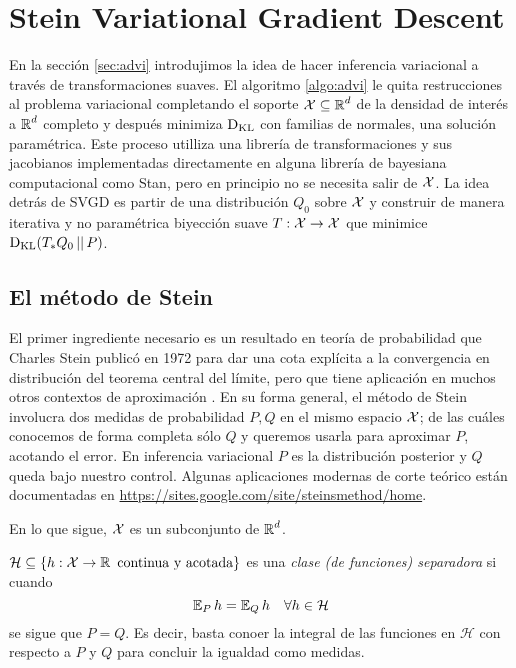 \documentclass[main.tex]{subfiles}
\begin{document}
\chapter{Stein Variational Gradient Descent}
En la sección \ref{sec:advi} introdujimos la idea de hacer inferencia variacional a través de transformaciones suaves. El algoritmo \eqref{algo:advi} le quita restrucciones al problema variacional completando el soporte $\operatorname{\mathcal{X}}\subseteq\operatorname{\mathbb{R}}^d$ de la densidad de interés a $\operatorname{\mathbb{R}}^d$ completo y después minimiza $\operatorname*{D_{KL}}$ con familias de normales, una solución paramétrica. Este proceso utilliza una librería de transformaciones y sus jacobianos implementadas directamente en alguna librería de bayesiana computacional como Stan\cite{advi}, pero en principio no se necesita salir de $\operatorname{\mathcal{X}}$. La idea detrás de SVGD es partir de una distribución $Q_0$ sobre $\operatorname{\mathcal{X}}$ y construir de manera iterativa y no paramétrica biyección suave $T: \operatorname{\mathcal{X}} \to \operatorname{\mathcal{X}}$ que minimice $\operatorname*{D_{KL}}(T_*Q_0\operatorname*{\mid\mid} P)$.

\section{El método de Stein}

El primer ingrediente necesario es un resultado en teoría de probabilidad que Charles Stein publicó en 1972 para dar una cota explícita a la convergencia en distribución del teorema central del límite, pero que tiene aplicación en muchos otros contextos de aproximación \cite{stein-magic-method, formal-stein-method}. En su forma general, el método de Stein involucra dos medidas de probabilidad $P, Q$ en el mismo espacio $\operatorname{\mathcal{X}}$; de las cuáles conocemos de forma completa sólo $Q$ y queremos usarla para aproximar $P$, acotando el error. En inferencia variacional $P$ es la distribución posterior y $Q$ queda bajo nuestro control. Algunas aplicaciones modernas de corte teórico están documentadas en \url{https://sites.google.com/site/steinsmethod/home}. 


En lo que sigue, $\operatorname{\mathcal{X}}$ es un subconjunto de $\operatorname{\mathbb{R}}^d$.

\begin{definition}
    $ \mathcal{H} \subseteq \{h: \operatorname{\mathcal{X}} \to \operatorname{\mathbb{{R}}} \textrm{ continua y acotada}\}$ es una \textit{clase (de funciones) separadora} si cuando 
    \begin{equation*}
        \operatorname{\mathbb{E}}_Ph = \operatorname{\mathbb{E}}_Qh \quad \forall h \in \mathcal{H} 
    \end{equation*}
    se sigue que $P=Q$. Es decir, basta conoer la integral de las funciones en $\mathcal{H}$ con respecto a $P$ y $Q$ para concluir la igualdad como medidas.
\end{definition}
\end{document}
